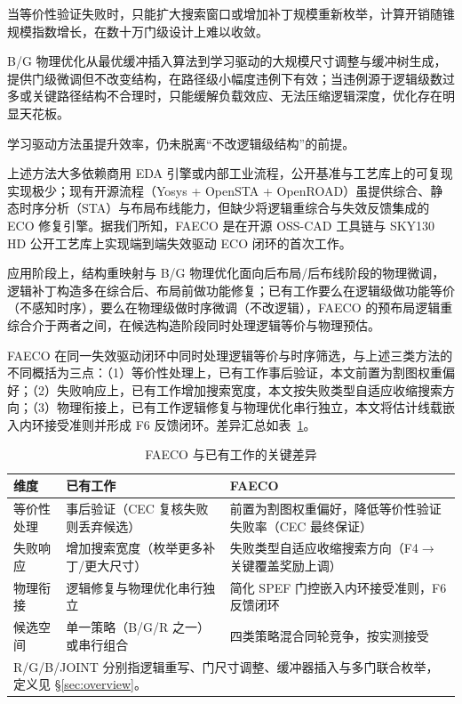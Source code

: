 \documentclass[journal]{IEEEtran}
\begin{document}
当等价性验证失败时，只能扩大搜索窗口或增加补丁规模重新枚举\cite{zhuo2018patch}，计算开销随锥规模指数增长，在数十万门级设计上难以收敛。

B/G 物理优化从最优缓冲插入算法\cite{liang2012buffer}到学习驱动的大规模尺寸调整与缓冲树生成\cite{liu2021rlsizer,huang2025phys,chen2024aito,zhang2025buffalo}，提供门级微调但不改变结构，在路径级小幅度违例下有效；当违例源于逻辑级数过多或关键路径结构不合理时，只能缓解负载效应、无法压缩逻辑深度，优化存在明显天花板\cite{liu2021rlsizer,huang2025phys}。

学习驱动方法\cite{chen2024aito,zhang2025buffalo}虽提升效率，仍未脱离“不改逻辑级结构”的前提。

上述方法大多依赖商用 EDA 引擎或内部工业流程，公开基准与工艺库上的可复现实现极少；现有开源流程（Yosys + OpenSTA + OpenROAD）虽提供综合、静态时序分析（STA）与布局布线能力，但缺少将逻辑重综合与失效反馈集成的 ECO 修复引擎。据我们所知，FAECO 是在开源 OSS-CAD 工具链与 SKY130 HD 公开工艺库上实现端到端失效驱动 ECO 闭环的首次工作。

应用阶段上，结构重映射与 B/G 物理优化面向后布局/后布线阶段的物理微调，逻辑补丁构造多在综合后、布局前做功能修复；已有工作要么在逻辑级做功能等价（不感知时序），要么在物理级做时序微调（不改逻辑），FAECO 的预布局逻辑重综合介于两者之间，在候选构造阶段同时处理逻辑等价与物理预估。

FAECO 在同一失效驱动闭环中同时处理逻辑等价与时序筛选，与上述三类方法的不同概括为三点：（1）等价性处理上，已有工作事后验证，本文前置为割图权重偏好；（2）失败响应上，已有工作增加搜索宽度，本文按失败类型自适应收缩搜索方向；（3）物理衔接上，已有工作逻辑修复与物理优化串行独立，本文将估计线载嵌入内环接受准则并形成 F6 反馈闭环。差异汇总如表~\ref{tab:related_diff}。

\begin{table}[!t]
\centering
\caption{FAECO 与已有工作的关键差异}
\label{tab:related_diff}
\footnotesize
\setlength{\tabcolsep}{3pt}
\begin{tabular}{p{2.2cm}p{2.8cm}p{3.2cm}}
\toprule
\textbf{维度} & \textbf{已有工作} & \textbf{FAECO} \\
\midrule
等价性处理 & 事后验证（CEC 复核失败则丢弃候选） & 前置为割图权重偏好，降低等价性验证失败率（CEC 最终保证） \\
失败响应 & 增加搜索宽度（枚举更多补丁/更大尺寸） & 失败类型自适应收缩搜索方向（F4$\to$关键覆盖奖励上调） \\
物理衔接 & 逻辑修复与物理优化串行独立 & 简化 SPEF 门控嵌入内环接受准则，F6 反馈闭环 \\
候选空间 & 单一策略（B/G/R 之一）或串行组合 & 四类策略混合同轮竞争，按实测接受 \\
\bottomrule
\multicolumn{3}{p{8.0cm}}{\footnotesize R/G/B/JOINT 分别指逻辑重写、门尺寸调整、缓冲器插入与多门联合枚举，定义见 \S\ref{sec:overview}。}\\
\end{tabular}
\end{table}
\end{document}
